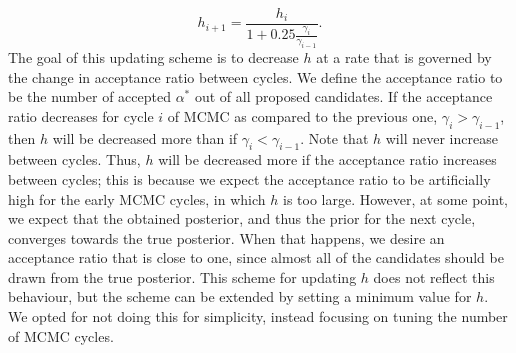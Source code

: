 \documentclass[11pt,a4paper]{article}
\begin{document}
\begin{equation}
    \label{eq:emprical_h}
    h_{i+1} = \frac{h_i}{1+0.25\frac{\gamma_i}{\gamma_{i-1}}}.
\end{equation}
The goal of this updating scheme is to decrease $h$ at a rate that is governed by the change in acceptance ratio between cycles. We define the acceptance ratio to be the number of accepted $\alpha^*$ out of all proposed candidates. If the acceptance ratio decreases for cycle $i$ of MCMC as compared to the previous one, $\gamma_i>\gamma_{i-1}$, then $h$ will be decreased more than if $\gamma_i<\gamma_{i-1}$. Note that $h$ will never increase between cycles. Thus, $h$ will be decreased more if the acceptance ratio increases between cycles; this is because we expect the acceptance ratio to be artificially high for the early MCMC cycles, in which $h$ is too large. However, at some point, we expect that the obtained posterior, and thus the prior for the next cycle, converges towards the true posterior. When that happens, we desire an acceptance ratio that is close to one, since almost all of the candidates should be drawn from the true posterior. This scheme for updating $h$ does not reflect this behaviour, but the scheme can be extended by setting a minimum value for $h$. We opted for not doing this for simplicity, instead focusing on tuning the number of MCMC cycles.
\end{document}
